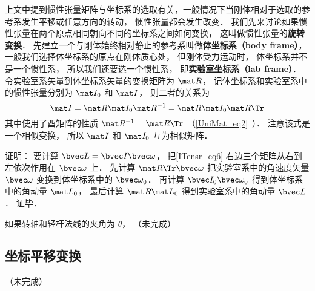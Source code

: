 上文中提到惯性张量矩阵与坐标系的选取有关，一般情况下当刚体相对于选取的参考系发生平移或任意方向的转动， 惯性张量都会发生改变．  我们先来讨论如果惯性张量在两个原点相同朝向不同的坐标系之间如何变换， 这叫做惯性张量的\textbf{旋转变换}． 先建立一个与刚体始终相对静止的参考系叫做\textbf{体坐标系（body frame）}， 一般我们选择体坐标系的原点在刚体质心处， 但刚体受力运动时， 体坐标系并不是一个惯性系， 所以我们还要选一个惯性系， 即\textbf{实验室坐标系（lab frame）}． 令实验室系矢量到体坐标系矢量的变换矩阵为 $\mat R$， 记体坐标系和实验室系中的惯性张量分别为 $\mat I_0$ 和 $\mat I$， 则二者的关系为
\begin{equation}\label{ITensr_eq6}
\mat I = \mat R \mat I_0 \mat R^{-1} = \mat R \mat I_0 \mat R\Tr
\end{equation}
其中使用了酉矩阵的性质 $\mat R^{-1} = \mat R\Tr$ （\autoref{UniMat_eq2}~）． 注意该式是一个相似变换， 所以 $\mat I$ 和 $\mat I_0$ 互为相似矩阵．

证明： 要计算 $\bvec L = \bvec I \bvec \omega$， 把\autoref{ITensr_eq6} 右边三个矩阵从右到左依次作用在 $\bvec \omega$ 上． 先计算 $\mat R\Tr \bvec \omega$ 把实验室系中的角速度矢量 $\bvec \omega$ 变换到体坐标系中的 $\bvec \omega_0$． 再计算 $\bvec I_0 \bvec \omega_0$ 得到体坐标系中的角动量 $\mat L_0$， 最后计算 $\mat R \mat L_0$ 得到实验室系中的角动量 $\bvec L$． 证毕．

\begin{example}{}
如果转轴和轻杆法线的夹角为 $\theta$， （未完成）
\end{example}

\subsection{坐标平移变换}
（未完成）

